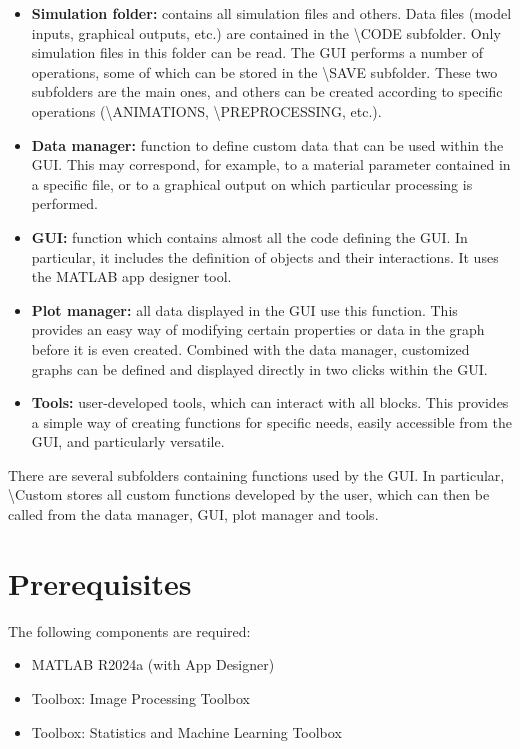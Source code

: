 \documentclass{article}
\begin{document}
\begin{itemize}
    \item \textbf{Simulation folder:} contains all simulation files and others. Data files (model inputs, graphical outputs, etc.) are contained in the \textbackslash CODE subfolder. Only simulation files in this folder can be read. The GUI performs a number of operations, some of which can be stored in the \textbackslash SAVE subfolder. These two subfolders are the main ones, and others can be created according to specific operations (\textbackslash ANIMATIONS, \textbackslash PREPROCESSING, etc.).
    \item \textbf{Data manager:} function to define custom data that can be used within the GUI. This may correspond, for example, to a material parameter contained in a specific file, or to a graphical output on which particular processing is performed.
    \item \textbf{GUI:} function which contains almost all the code defining the GUI. In particular, it includes the definition of objects and their interactions. It uses the MATLAB app designer tool.
    \item \textbf{Plot manager:} all data displayed in the GUI use this function. This provides an easy way of modifying certain properties or data in the graph before it is even created. Combined with the data manager, customized graphs can be defined and displayed directly in two clicks within the GUI.
    \item \textbf{Tools:} user-developed tools, which can interact with all blocks. This provides a simple way of creating functions for specific needs, easily accessible from the GUI, and particularly versatile.
\end{itemize}

There are several subfolders containing functions used by the GUI. In particular, \textbackslash Custom stores all custom functions developed by the user, which can then be called from the data manager, GUI, plot manager and tools.

\section{Prerequisites}

The following components are required:

\begin{itemize}
    \item MATLAB R2024a (with App Designer)
    \item Toolbox: Image Processing Toolbox
    \item Toolbox: Statistics and Machine Learning Toolbox
\end{itemize}
\end{document}
